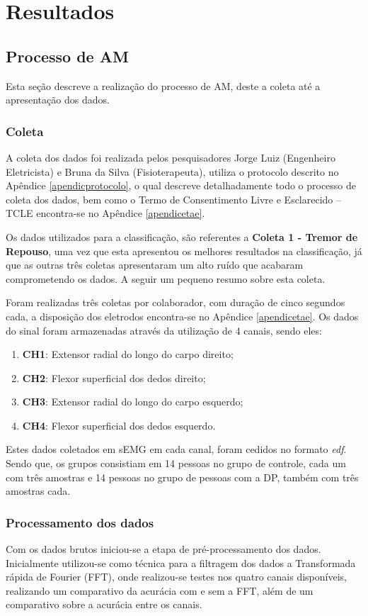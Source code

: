 \chapter{Resultados}
\label{ch:Resultados}
\section{Processo de AM}
Esta seção descreve a realização do processo de AM, deste a coleta até a apresentação dos dados.
\subsection{Coleta}
A coleta dos dados foi realizada pelos pesquisadores Jorge Luiz (Engenheiro Eletricista) e Bruna da Silva (Fisioterapeuta), utiliza o protocolo descrito no Apêndice \ref{apendicprotocolo}, o qual descreve detalhadamente todo o processo de coleta dos dados, bem como o Termo de Consentimento Livre e Esclarecido – TCLE encontra-se no  Apêndice \ref{apendicetae}.

Os dados utilizados para a classificação, são referentes a \textbf{Coleta 1 - Tremor de Repouso}, uma vez que esta apresentou os melhores resultados na classificação, já que as outras três coletas apresentaram um alto ruído que acabaram comprometendo os dados. A seguir um pequeno resumo sobre esta coleta.

Foram realizadas três coletas por colaborador, com duração de cinco segundos cada, a disposição dos eletrodos encontra-se no Apêndice \ref{apendicetae}. Os dados do sinal foram armazenadas através da utilização de 4 canais, sendo eles:
\begin{enumerate}
    \item \textbf{CH1}: Extensor radial do longo do carpo direito;
    \item \textbf{CH2}: Flexor superficial dos dedos direito;
    \item \textbf{CH3}: Extensor radial do longo do carpo esquerdo;
    \item \textbf{CH4}: Flexor superficial dos dedos esquerdo.
\end{enumerate}

Estes dados coletados em sEMG em cada canal, foram cedidos no formato \textit{edf}. Sendo que, os grupos consistiam em 14 pessoas no grupo de controle, cada um com três amostras e 14 pessoas no grupo de pessoas com a DP, também com três amostras cada.

\subsection{Processamento dos dados}
Com os dados brutos iniciou-se a etapa de pré-processamento dos dados. Inicialmente utilizou-se como técnica para a filtragem dos dados a Transformada rápida de Fourier (FFT), onde realizou-se testes nos quatro canais disponíveis, realizando um comparativo da acurácia com e sem a FFT, além de um comparativo sobre a acurácia entre os canais.

